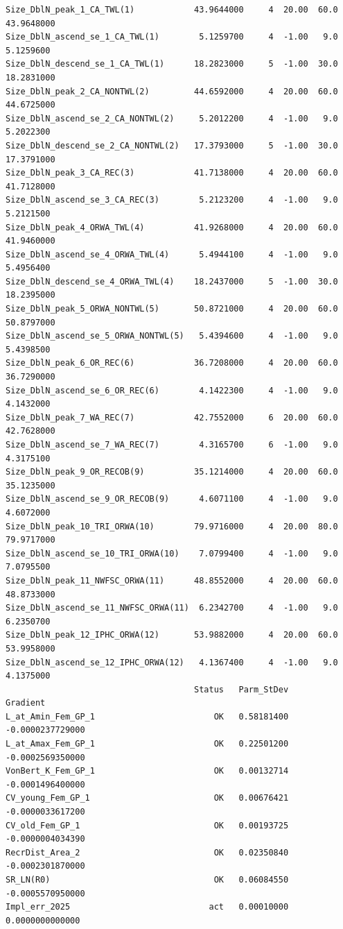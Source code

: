 \documentclass[
]{scrartcl}
\begin{document}
\begin{verbatim}
Size_DblN_peak_1_CA_TWL(1)            43.9644000     4  20.00  60.0 43.9648000
Size_DblN_ascend_se_1_CA_TWL(1)        5.1259700     4  -1.00   9.0  5.1259600
Size_DblN_descend_se_1_CA_TWL(1)      18.2823000     5  -1.00  30.0 18.2831000
Size_DblN_peak_2_CA_NONTWL(2)         44.6592000     4  20.00  60.0 44.6725000
Size_DblN_ascend_se_2_CA_NONTWL(2)     5.2012200     4  -1.00   9.0  5.2022300
Size_DblN_descend_se_2_CA_NONTWL(2)   17.3793000     5  -1.00  30.0 17.3791000
Size_DblN_peak_3_CA_REC(3)            41.7138000     4  20.00  60.0 41.7128000
Size_DblN_ascend_se_3_CA_REC(3)        5.2123200     4  -1.00   9.0  5.2121500
Size_DblN_peak_4_ORWA_TWL(4)          41.9268000     4  20.00  60.0 41.9460000
Size_DblN_ascend_se_4_ORWA_TWL(4)      5.4944100     4  -1.00   9.0  5.4956400
Size_DblN_descend_se_4_ORWA_TWL(4)    18.2437000     5  -1.00  30.0 18.2395000
Size_DblN_peak_5_ORWA_NONTWL(5)       50.8721000     4  20.00  60.0 50.8797000
Size_DblN_ascend_se_5_ORWA_NONTWL(5)   5.4394600     4  -1.00   9.0  5.4398500
Size_DblN_peak_6_OR_REC(6)            36.7208000     4  20.00  60.0 36.7290000
Size_DblN_ascend_se_6_OR_REC(6)        4.1422300     4  -1.00   9.0  4.1432000
Size_DblN_peak_7_WA_REC(7)            42.7552000     6  20.00  60.0 42.7628000
Size_DblN_ascend_se_7_WA_REC(7)        4.3165700     6  -1.00   9.0  4.3175100
Size_DblN_peak_9_OR_RECOB(9)          35.1214000     4  20.00  60.0 35.1235000
Size_DblN_ascend_se_9_OR_RECOB(9)      4.6071100     4  -1.00   9.0  4.6072000
Size_DblN_peak_10_TRI_ORWA(10)        79.9716000     4  20.00  80.0 79.9717000
Size_DblN_ascend_se_10_TRI_ORWA(10)    7.0799400     4  -1.00   9.0  7.0795500
Size_DblN_peak_11_NWFSC_ORWA(11)      48.8552000     4  20.00  60.0 48.8733000
Size_DblN_ascend_se_11_NWFSC_ORWA(11)  6.2342700     4  -1.00   9.0  6.2350700
Size_DblN_peak_12_IPHC_ORWA(12)       53.9882000     4  20.00  60.0 53.9958000
Size_DblN_ascend_se_12_IPHC_ORWA(12)   4.1367400     4  -1.00   9.0  4.1375000
                                      Status   Parm_StDev         Gradient
L_at_Amin_Fem_GP_1                        OK   0.58181400 -0.0000237729000
L_at_Amax_Fem_GP_1                        OK   0.22501200 -0.0002569350000
VonBert_K_Fem_GP_1                        OK   0.00132714 -0.0001496400000
CV_young_Fem_GP_1                         OK   0.00676421 -0.0000033617200
CV_old_Fem_GP_1                           OK   0.00193725 -0.0000004034390
RecrDist_Area_2                           OK   0.02350840 -0.0002301870000
SR_LN(R0)                                 OK   0.06084550 -0.0005570950000
Impl_err_2025                            act   0.00010000  0.0000000000000

\end{verbatim}
\end{document}
